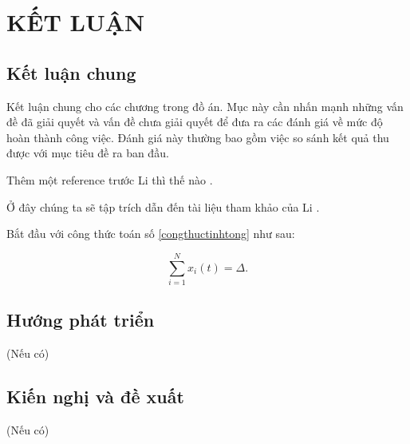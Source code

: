\documentclass{article} %
\begin{document}
\section*{KẾT LUẬN}
\subsection*{Kết luận chung}
Kết luận chung cho các chương trong đồ án. Mục này cần nhấn mạnh những vấn đề đã giải quyết và vấn đề chưa giải quyết để đưa ra các đánh giá về mức độ hoàn thành công việc. Đánh giá này thường bao gồm việc so sánh kết quả thu được với mục tiêu đề ra ban đầu.

Thêm một reference trước Li thì thế nào \cite{Yang2020}.

Ở đây chúng ta sẽ tập trích dẫn đến tài liệu tham khảo của Li \cite{Li2018}.

Bắt đầu với công thức toán số \eqref{congthuctinhtong} như sau:

\begin{equation}\label{congthuctinhtong}
    \sum_{i=1}^N x_i(t) = \Delta.
\end{equation}

\subsection*{Hướng phát triển}
(Nếu có)
\subsection*{Kiến nghị và đề xuất}
(Nếu có)
\newpage
{}


\newpage
\end{document}
